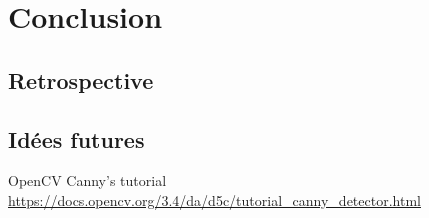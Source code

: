 \documentclass[11pt, french]{article}
\begin{document}
\section{Conclusion}

\subsection{Retrospective}

\subsection{Idées futures}






\newpage
\begin{thebibliography}{99}

 OpenCV Canny's tutorial \url{https://docs.opencv.org/3.4/da/d5c/tutorial_canny_detector.html}

\end{thebibliography}


\end{document}
